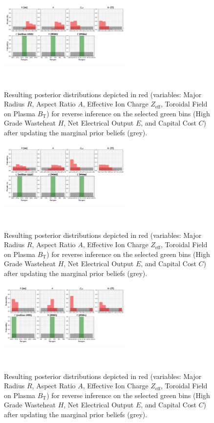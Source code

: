 \begin{figure}[!b]
    \centering
    \includegraphics[width=0.6\textwidth]{figures/TE_results/march_data/config(57)_3outputs_V2_1.png}
    \caption{Resulting posterior distributions depicted in red (variables: Major Radius $R$, Aspect Ratio $A$, Effective Ion Charge $Z_{\text{eff}}$, Toroidal Field on Plasma $B_{\text{T}}$) for reverse inference on the selected green bins (High Grade Wasteheat $H$, Net Electrical Output $E$, and  Capital Cost $C$) after updating the marginal prior beliefs (grey).}~\label{fig:config(57)_3outputs_V2_1}
\end{figure}

\begin{figure}[!b]
    \centering
    \includegraphics[width=0.6\textwidth]{figures/TE_results/march_data/config(57)_3outputs_V2_2.png}
    \caption{Resulting posterior distributions depicted in red (variables: Major Radius $R$, Aspect Ratio $A$, Effective Ion Charge $Z_{\text{eff}}$, Toroidal Field on Plasma $B_{\text{T}}$) for reverse inference on the selected green bins (High Grade Wasteheat $H$, Net Electrical Output $E$, and  Capital Cost $C$) after updating the marginal prior beliefs (grey).}~\label{fig:config(57)_3outputs_V2_2}
\end{figure}

\begin{figure}[!b]
    \centering
    \includegraphics[width=0.6\textwidth]{figures/TE_results/march_data/config(57)_3outputs_V2_3.png}
    \caption{Resulting posterior distributions depicted in red (variables: Major Radius $R$, Aspect Ratio $A$, Effective Ion Charge $Z_{\text{eff}}$, Toroidal Field on Plasma $B_{\text{T}}$) for reverse inference on the selected green bins (High Grade Wasteheat $H$, Net Electrical Output $E$, and  Capital Cost $C$) after updating the marginal prior beliefs (grey).}~\label{fig:config(57)_3outputs_V2_3}
\end{figure}


